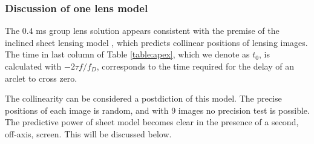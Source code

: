 \documentclass[useAMS,usenatbib]{mn2e}
\begin{document}



\subsubsection{Discussion of one lens model}

The $0.4$ ms group lens solution appears consistent with the premise
of the inclined sheet lensing model \citep{2014MNRAS.442.3338P}, which
predicts collinear positions of lensing images.  The time in last
column of Table \ref{table:apex}, which we denote as $t_0$, is
calculated with $-2{\tau}f/{f_{D}}$, corresponds to the time required
for the delay of an arclet to cross zero.

The collinearity can be considered a postdiction of this model.  The
precise positions of each image is random, and with 9 images no
precision test is possible.  The predictive power of sheet model
becomes clear in the presence of a second, off-axis, screen.  This
will be discussed below.


\end{document}
